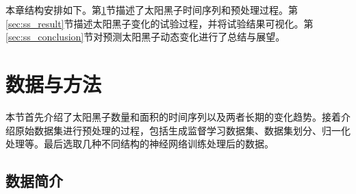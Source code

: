 本章结构安排如下。第\ref{sec:ss_data_method}节描述了太阳黑子时间序列和预处理过程。第\ref{sec:ss_result}节描述太阳黑子变化的试验过程，并将试验结果可视化。第\ref{sec:ss_conclusion}节对预测太阳黑子动态变化进行了总结与展望。

\section{数据与方法}\label{sec:ss_data_method}

本节首先介绍了太阳黑子数量和面积的时间序列以及两者长期的变化趋势。接着介绍原始数据集进行预处理的过程，包括生成监督学习数据集、数据集划分、归一化处理等。最后选取几种不同结构的神经网络训练处理后的数据。

\subsection{数据简介}\label{sec:ss_dataset}


